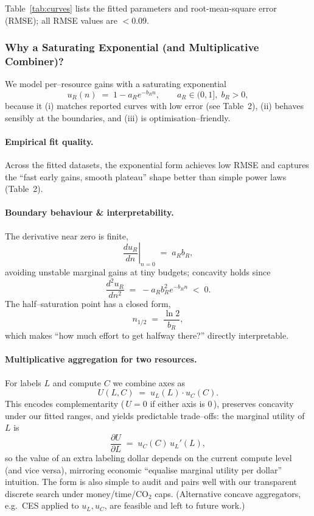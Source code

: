 \documentclass[11pt]{article}
\begin{document}
Table~\ref{tab:curves} lists the fitted parameters and root-mean-square error (RMSE); all RMSE values are \(<0.09\).

\subsubsection{Why a Saturating Exponential (and Multiplicative Combiner)?}

We model per–resource gains with a saturating exponential
\[
u_R(n) \;=\; 1 - a_R e^{-b_R n}, \qquad a_R\in(0,1],\; b_R>0,
\]
because it (i) matches reported curves with low error (see Table~2), (ii) behaves sensibly at the boundaries, and (iii) is optimisation–friendly.

\paragraph{Empirical fit quality.}
Across the fitted datasets, the exponential form achieves low RMSE and captures the “fast early gains, smooth plateau” shape better than simple power laws (Table~2).

\paragraph{Boundary behaviour \& interpretability.}
The derivative near zero is finite,
\[
\left.\frac{d u_R}{dn}\right|_{n=0} \;=\; a_R b_R,
\]
avoiding unstable marginal gains at tiny budgets; concavity holds since
\[
\frac{d^2 u_R}{dn^2} \;=\; -a_R b_R^2 e^{-b_R n} \;<\; 0.
\]
The half–saturation point has a closed form,
\[
n_{1/2} \;=\; \frac{\ln 2}{b_R},
\]
which makes “how much effort to get halfway there?” directly interpretable.

\paragraph{Multiplicative aggregation for two resources.}
For labels $L$ and compute $C$ we combine axes as
\[
U(L,C) \;=\; u_L(L)\cdot u_C(C).
\]
This encodes complementarity (\,$U=0$ if either axis is $0$\,), preserves concavity under our fitted ranges, and yields predictable trade–offs: the marginal utility of $L$ is
\[
\frac{\partial U}{\partial L} \;=\; u_C(C)\,u_L'(L),
\]
so the value of an extra labeling dollar depends on the current compute level (and vice versa), mirroring economic “equalise marginal utility per dollar” intuition. The form is also simple to audit and pairs well with our transparent discrete search under money/time/CO$_2$ caps. (Alternative concave aggregators, e.g.\ CES applied to $u_L,u_C$, are feasible and left to future work.)
\end{document}
